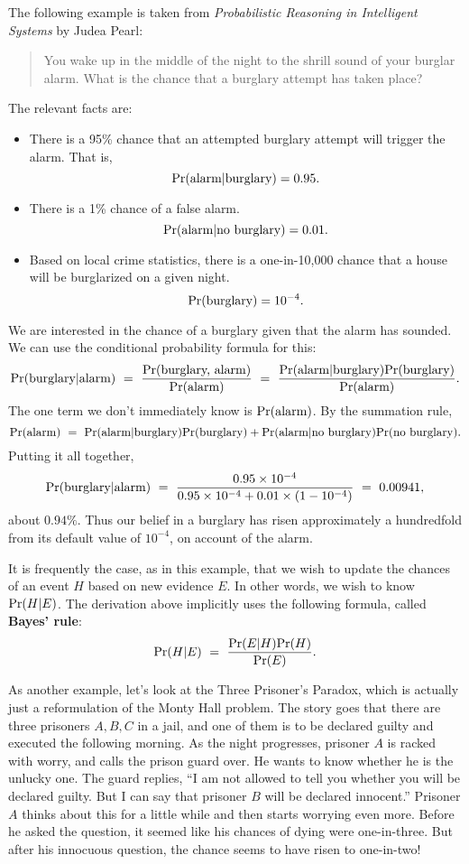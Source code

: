 The following example is taken from {\it Probabilistic Reasoning in Intelligent Systems} by Judea Pearl:
\begin{quote}
You wake up in the middle of the night to the shrill sound of your burglar alarm. What is the chance that a burglary attempt has taken place?
\end{quote}
The relevant facts are:
\begin{itemize}
\item There is a 95\% chance that an attempted burglary attempt will trigger the alarm. That is,
$$ \mbox{\rm Pr}(\mbox{alarm} | \mbox{burglary}) = 0.95 .$$
\item There is a 1\% chance of a false alarm.
$$ \mbox{\rm Pr}(\mbox{alarm} | \mbox{no burglary}) = 0.01.$$
\item Based on local crime statistics, there is a one-in-10{,}000 chance that a house will be burglarized on a given night.
$$ \mbox{\rm Pr}(\mbox{burglary}) = 10^{-4}.$$
\end{itemize}
We are interested in the chance of a burglary given that the alarm has sounded. We can use the conditional probability formula for this:
$$ \mbox{\rm Pr}(\mbox{burglary} | \mbox{alarm}) 
\ = \ \frac{\mbox{\rm Pr}(\mbox{burglary, alarm})}{\mbox{\rm Pr}(\mbox{alarm})}
\ = \ \frac{\mbox{\rm Pr}(\mbox{alarm} | \mbox{burglary}) \mbox{\rm Pr}(\mbox{burglary})}{\mbox{\rm Pr}(\mbox{alarm})}
.$$
The one term we don't immediately know is $\mbox{\rm Pr}(\mbox{alarm})$. By the summation rule,
$$ 
\pr(\mbox{alarm}) 
\ = \ 
\pr(\mbox{alarm} | \mbox{burglary}) \pr(\mbox{burglary}) +
\pr(\mbox{alarm} | \mbox{no burglary}) \pr(\mbox{no burglary})
.$$
Putting it all together,
$$ \pr(\mbox{burglary} | \mbox{alarm}) 
\ = \ 
\frac{0.95 \times 10^{-4}}{0.95 \times 10^{-4} + 0.01 \times (1-10^{-4})}
\ = \ 
0.00941,
$$
about $0.94\%$. Thus our belief in a burglary has risen approximately a hundredfold from its default value of $10^{-4}$, on account of the alarm.

It is frequently the case, as in this example, that we wish to update the chances of an event $H$ based on new evidence $E$. In other words, we wish to know $\mbox{\rm Pr}(H | E)$. The derivation above implicitly uses the following formula, called {\bf Bayes' rule}:
$$ \pr(H | E) 
\ = \ 
\frac{\pr(E|H) \pr(H)}{\pr(E)}.
$$  

As another example, let's look at the Three Prisoner's Paradox, which
is actually just a reformulation of the Monty Hall problem. The story
goes that there are three prisoners $A,B,C$ in a jail, and one of them
is to be declared guilty and executed the following morning. As the
night progresses, prisoner $A$ is racked with worry, and calls the
prison guard over. He wants to know whether he is the unlucky one. The
guard replies, ``I am not allowed to tell you whether you will be
declared guilty. But I can say that prisoner $B$ will be declared
innocent.'' Prisoner $A$ thinks about this for a little while and then
starts worrying even more. Before he asked the question, it seemed
like his chances of dying were one-in-three. But after his innocuous
question, the chance seems to have risen to one-in-two!

